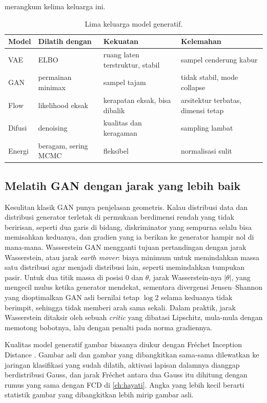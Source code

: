  merangkum kelima keluarga ini.

\begin{table}[ht]
\centering\small
\caption{Lima keluarga model generatif.}
\label{tab:generatif}
\begin{tabularx}{\linewidth}{@{}lXXX@{}}
\toprule
Model & Dilatih dengan & Kekuatan & Kelemahan \\
\midrule
VAE & ELBO & ruang laten terstruktur, stabil & sampel cenderung kabur \\
GAN & permainan minimax & sampel tajam & tidak stabil, mode collapse \\
Flow & likelihood eksak & kerapatan eksak, bisa dibalik & arsitektur terbatas, dimensi tetap \\
Difusi & denoising & kualitas dan keragaman & sampling lambat \\
Energi & beragam, sering MCMC & fleksibel & normalisasi sulit \\
\bottomrule
\end{tabularx}
\end{table}

\subsection{Melatih GAN dengan jarak yang lebih baik}

Kesulitan klasik GAN punya penjelasan geometris. Kalau distribusi data dan distribusi generator terletak di permukaan
berdimensi rendah yang tidak beririsan, seperti dua garis di bidang, diskriminator yang sempurna selalu bisa memisahkan
keduanya, dan gradien yang ia berikan ke generator hampir nol di mana-mana. Wasserstein GAN \citep{arjovsky2017} mengganti
tujuan pertandingan dengan jarak Wasserstein, atau jarak \emph{earth mover}: biaya minimum untuk memindahkan massa satu
distribusi agar menjadi distribusi lain, seperti memindahkan tumpukan pasir. Untuk dua titik massa di posisi $0$ dan
$\theta$, jarak Wasserstein-nya $|\theta|$, yang mengecil mulus ketika generator mendekat, sementara divergensi
Jensen--Shannon yang dioptimalkan GAN asli bernilai tetap $\log2$ selama keduanya tidak berimpit, sehingga tidak memberi
arah sama sekali. Dalam praktik, jarak Wasserstein ditaksir oleh sebuah \emph{critic} yang dibatasi Lipschitz, mula-mula
dengan memotong bobotnya, lalu dengan penalti pada norma gradiennya.

Kualitas model generatif gambar biasanya diukur dengan Fréchet Inception Distance \citep{heusel2017}. Gambar asli dan gambar
yang dibangkitkan sama-sama dilewatkan ke jaringan klasifikasi yang sudah dilatih, aktivasi lapisan dalamnya dianggap
berdistribusi Gauss, dan jarak Fréchet antara dua Gauss itu dihitung dengan rumus yang sama dengan FCD di \cref{ch:hayati}.
Angka yang lebih kecil berarti statistik gambar yang dibangkitkan lebih mirip gambar asli.

